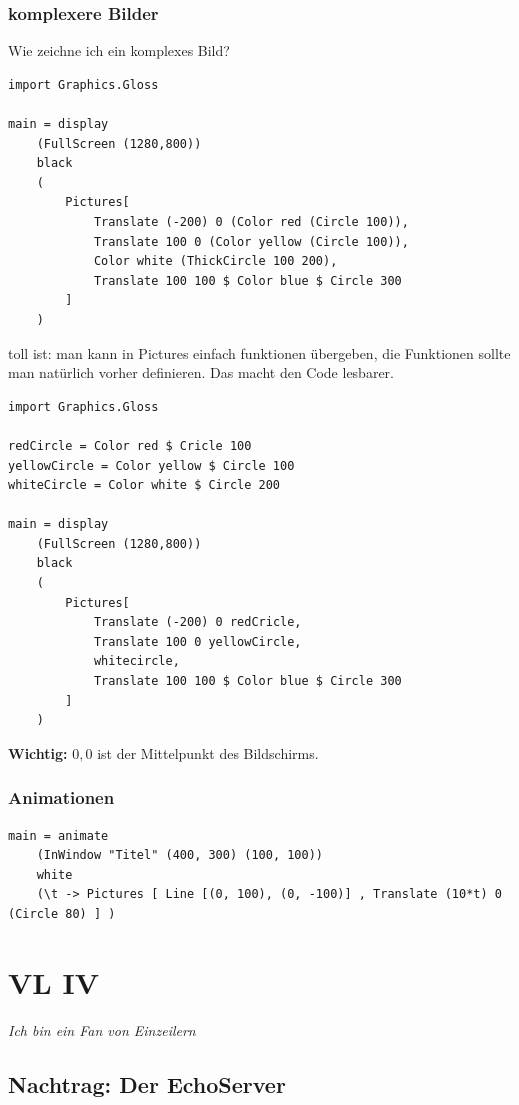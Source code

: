 \documentclass[ngerman,a4paper]{report}
\begin{document}
\subsection{komplexere Bilder}
Wie zeichne ich ein komplexes Bild?\\
\begin{lstlisting}
import Graphics.Gloss

main = display
	(FullScreen (1280,800)) 
	black
	(
		Pictures[
			Translate (-200) 0 (Color red (Circle 100)),
			Translate 100 0 (Color yellow (Circle 100)),
			Color white (ThickCircle 100 200),
			Translate 100 100 $ Color blue $ Circle 300
		]		
	) 
\end{lstlisting}
toll ist: man kann in Pictures einfach funktionen übergeben, die Funktionen sollte man natürlich vorher definieren. Das macht den Code lesbarer.
\begin{lstlisting}
import Graphics.Gloss

redCircle = Color red $ Cricle 100
yellowCircle = Color yellow $ Circle 100
whiteCircle = Color white $ Circle 200

main = display
	(FullScreen (1280,800)) 
	black
	(
		Pictures[
			Translate (-200) 0 redCricle,
			Translate 100 0 yellowCircle,
			whitecircle,
			Translate 100 100 $ Color blue $ Circle 300
		]		
	)
\end{lstlisting}

\textbf{Wichtig:} $0,0$ ist der Mittelpunkt des Bildschirms.

\subsection{Animationen}
\begin{lstlisting}
main = animate
	(InWindow "Titel" (400, 300) (100, 100))
	white
	(\t -> Pictures [ Line [(0, 100), (0, -100)] , Translate (10*t) 0 (Circle 80) ] )
\end{lstlisting}

\chapter{VL IV}
\emph{Ich bin ein Fan von Einzeilern}
\section{Nachtrag: Der EchoServer}
\begin{lstlisting}
\end{lstlisting}
\end{document}
